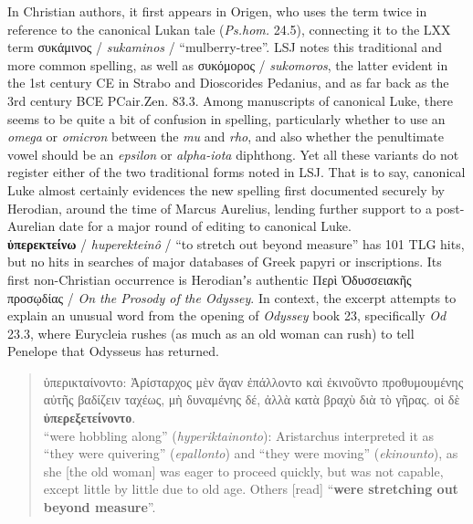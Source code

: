 In Christian authors, it first appears in Origen, %
who uses the term twice in reference to the canonical Lukan tale (\textit{Ps.hom.} 24.5), %
connecting it to the LXX term συκάμινος / \textit{sukaminos} / “mulberry-tree”. %
LSJ notes this traditional and more common spelling, as well as συκόμορος / \textit{sukomoros}, %
the latter evident in the 1st century CE in Strabo and Dioscorides Pedanius, %
and as far back as the 3rd century BCE PCair.Zen. 83.3. %
Among manuscripts of canonical Luke, there seems to be quite a bit of confusion in spelling, %
particularly whether to use an \textit{omega} or \textit{omicron} between the \textit{mu} and \textit{rho}, %
and also whether the penultimate vowel should be an \textit{epsilon} or \textit{alpha-iota} diphthong. Yet all these variants do not register either of the two traditional forms noted in LSJ. %
That is to say, canonical Luke almost certainly evidences the new spelling first documented securely by Herodian, %
around the time of Marcus Aurelius, %
lending further support to a post-Aurelian date for a major round of editing to canonical Luke. \\[1mm] %

\noindent{}\textbf{ὑπερεκτείνω} / \textit{huperekteinô} / “to stretch out beyond measure” %
has 101 TLG hits, but no hits in searches of major databases of Greek papyri or inscriptions. %
Its first non-Christian occurrence is Herodianʼs authentic Περὶ Ὀδυσσειακῆς προσῳδίας / \textit{On the Prosody of the Odyssey}. %
In context, the excerpt attempts to explain an unusual word from the opening of \textit{Odyssey} book 23, %
specifically \textit{Od} 23.3, where Eurycleia rushes (as much as an old woman can rush) %
to tell Penelope that Odysseus has returned. %

\vspace*{2mm} 
 \begin{quote}ὑπερικταίνοντο: Ἀρίσταρχος μὲν ἄγαν ἐπάλλοντο καὶ ἐκινοῦντο %
 προθυμουμένης αὐτῆς βαδίζειν ταχέως, μὴ δυναμένης δέ, ἀλλὰ κατὰ %
 βραχὺ διὰ τὸ γῆρας. οἱ δὲ \textbf{ὑπερεξετείνοντο}. \\[1mm] %
 “were hobbling along” (\textit{hyperiktainonto}): Aristarchus %
 interpreted it as “they were quivering” (\textit{epallonto}) and “they were moving” (\textit{ekinounto}), %
 as she [the old woman] was eager to proceed quickly, but was not capable, %
 except little by little due to old age. %
 Others [read] “\textbf{were stretching out beyond measure}”. \end{quote} %
 \clearpage

